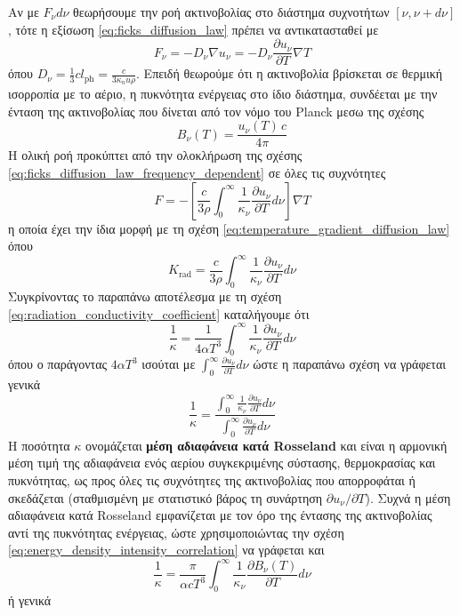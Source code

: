 Αν με $F_\nu d\nu$ θεωρήσουμε την ροή ακτινοβολίας στο διάστημα συχνοτήτων $[\nu, \nu+d\nu]$, τότε η εξίσωση \eqref{eq:ficks_diffusion_law} πρέπει να αντικατασταθεί με
\begin{equation}
    \label{eq:ficks_diffusion_law_frequency_dependent}
    F_\nu = -D_\nu \nabla u_\nu = -D_\nu \frac{\partial u_\nu}{\partial T} \nabla T
\end{equation}
όπου $D_\nu = \frac{1}{3} c l_{\text{ph}} = \frac{c}{3 \kappa_nu \rho}$.  Επειδή θεωρούμε ότι η ακτινοβολία βρίσκεται σε θερμική ισορροπία με το αέριο, η πυκνότητα ενέργειας στο ίδιο διάστημα, συνδέεται με την ένταση της ακτινοβολίας που δίνεται από τον νόμο του Planck μεσω της σχέσης
\begin{equation}
    \label{eq:energy_density_intensity_correlation}
    B_\nu (T) = \frac{u_\nu (T) \,c}{4\pi}
\end{equation}
Η ολική ροή προκύπτει από την ολοκλήρωση της σχέσης \eqref{eq:ficks_diffusion_law_frequency_dependent} σε όλες τις συχνότητες
\begin{equation*}
    F = - \left[\frac{c}{3 \rho} \int_{0}^{\infty} \frac{1}{\kappa_\nu} \frac{\partial u_{\nu}}{\partial T} d\nu \right] \nabla T
\end{equation*}
η οποία έχει την ίδια μορφή με τη σχέση \eqref{eq:temperature_gradient_diffusion_law} όπου 
\begin{equation*}
    K_{\text{rad}} = \frac{c}{3 \rho} \int_{0}^{\infty} \frac{1}{\kappa_\nu} \frac{\partial u_{\nu}}{\partial T} d\nu
\end{equation*}
Συγκρίνοντας το παραπάνω αποτέλεσμα με τη σχέση \eqref{eq:radiation_conductivity_coefficient} καταλήγουμε ότι
\begin{equation}
    \frac{1}{\kappa} = \frac{1}{4\alpha T^3} \int_{0}^{\infty} \frac{1}{\kappa_\nu} \frac{\partial u_{\nu}}{\partial T} d\nu
\end{equation}
όπου ο παράγοντας $4 \alpha T^3$ ισούται με $\int_{0}^{\infty} \frac{\partial u_\nu}{\partial T} d\nu$ ώστε η παραπάνω σχέση να γράφεται γενικά
\begin{equation}
    \label{eq:rosseland_mean_opacity_energy_density}
    \frac{1}{\kappa} = \frac{\int_{0}^{\infty} \frac{1}{\kappa_\nu} \frac{\partial u_{\nu}}{\partial T} d\nu}{\int_{0}^{\infty} \frac{\partial u_\nu}{\partial T} d\nu}
\end{equation}
Η ποσότητα $\kappa$ ονομάζεται \textbf{μέση αδιαφάνεια κατά Rosseland} και είναι η αρμονική μέση τιμή της αδιαφάνεια ενός αερίου συγκεκριμένης σύστασης, θερμοκρασίας και πυκνότητας, ως προς όλες τις συχνότητες της ακτινοβολίας που απορροφάται ή σκεδάζεται (σταθμισμένη με στατιστικό βάρος τη συνάρτηση $\partial u_\nu / \partial T$). Συχνά η μέση αδιαφάνεια κατά Rosseland εμφανίζεται με τον όρο της έντασης της ακτινοβολίας αντί της πυκνότητας ενέργειας, ώστε χρησιμοποιώντας την σχέση \eqref{eq:energy_density_intensity_correlation} να γράφεται και
\begin{equation*}
    \frac{1}{\kappa} = \frac{\pi}{\alpha c T^3} \int_{0}^{\infty} \frac{1}{\kappa_\nu} \frac{\partial B_{\nu} (T)}{\partial T} d\nu
\end{equation*}
ή γενικά

